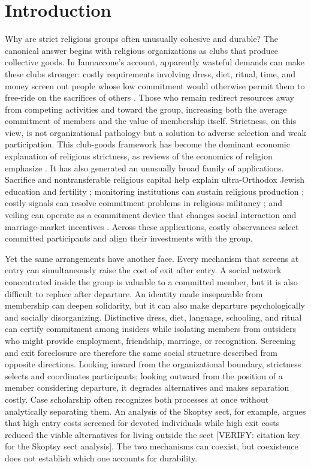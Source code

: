 \section*{Introduction}

Why are strict religious groups often unusually cohesive and durable? The canonical answer begins with religious organizations as clubs that produce collective goods. In Iannaccone's account, apparently wasteful demands can make these clubs stronger: costly requirements involving dress, diet, ritual, time, and money screen out people whose low commitment would otherwise permit them to free-ride on the sacrifices of others \citep{iannaccone1988,iannaccone1992,iannaccone1994}. Those who remain redirect resources away from competing activities and toward the group, increasing both the average commitment of members and the value of membership itself. Strictness, on this view, is not organizational pathology but a solution to adverse selection and weak participation. This club-goods framework has become the dominant economic explanation of religious strictness, as reviews of the economics of religion emphasize \citep{iyer2016,carvalho2019}. It has also generated an unusually broad family of applications. Sacrifice and nontransferable religious capital help explain ultra-Orthodox Jewish education and fertility \citep{berman2000}; monitoring institutions can sustain religious production \citep{mcbride2007}; costly signals can resolve commitment problems in religious militancy \citep{bermanlaitin2008}; and veiling can operate as a commitment device that changes social interaction and marriage-market incentives \citep{carvalho2013}. Across these applications, costly observances select committed participants and align their investments with the group.

Yet the same arrangements have another face. Every mechanism that screens at entry can simultaneously raise the cost of exit after entry. A social network concentrated inside the group is valuable to a committed member, but it is also difficult to replace after departure. An identity made inseparable from membership can deepen solidarity, but it can also make departure psychologically and socially disorganizing. Distinctive dress, diet, language, schooling, and ritual can certify commitment among insiders while isolating members from outsiders who might provide employment, friendship, marriage, or recognition. Screening and exit foreclosure are therefore the same social structure described from opposite directions. Looking inward from the organizational boundary, strictness selects and coordinates participants; looking outward from the position of a member considering departure, it degrades alternatives and makes separation costly. Case scholarship often recognizes both processes at once without analytically separating them. An analysis of the Skoptsy sect, for example, argues that high entry costs screened for devoted individuals while high exit costs reduced the viable alternatives for living outside the sect [VERIFY: citation key for the Skoptsy sect analysis]. The two mechanisms can coexist, but coexistence does not establish which one accounts for durability.

